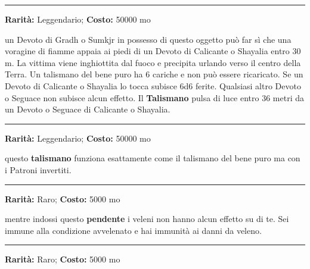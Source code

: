 \begin{multicols}{2}
\smallskip\noindent\rule{\linewidth}{2pt}  \hypertarget{TalismanodelBenepuro}{}\medskip{}\noindent\label{TalismanodelBenepuro}

\textbf{Rarità:} Leggendario; \textbf{Costo:} 50000 mo

un Devoto di Gradh o Sumkjr in possesso di questo oggetto può far sì che una voragine di fiamme appaia ai piedi di un Devoto di Calicante o Shayalia entro 30 m. La vittima viene inghiottita dal fuoco e precipita urlando verso il centro della Terra. Un talismano del bene puro ha 6 cariche e non può essere ricaricato. Se un Devoto di Calicante o Shayalia lo tocca subisce 6d6 ferite. Qualsiasi altro Devoto o Seguace non subisce alcun effetto. Il \textbf{Talismano} pulsa di luce entro 36 metri da un Devoto o Seguace di Calicante o Shayalia.

\smallskip\noindent\rule{\linewidth}{2pt}  \hypertarget{TalismanodelMaleestremo}{}\medskip{}\noindent\label{TalismanodelMaleestremo}

\textbf{Rarità:} Leggendario; \textbf{Costo:} 50000 mo

questo \textbf{talismano} funziona esattamente come il talismano del bene puro ma con i Patroni invertiti.

\smallskip\noindent\rule{\linewidth}{2pt}  \hypertarget{TalismanodellaProtezionedalVeleno}{}\medskip{}\noindent\label{TalismanodellaProtezionedalVeleno}

\textbf{Rarità:} Raro; \textbf{Costo:} 5000 mo

mentre indossi questo \textbf{pendente} i veleni non hanno alcun effetto su di te. Sei immune alla condizione avvelenato e hai immunità ai danni da veleno.

\smallskip\noindent\rule{\linewidth}{2pt}  \hypertarget{TalismanodellaSalute}{}\medskip{}\noindent\label{TalismanodellaSalute}

\textbf{Rarità:} Raro; \textbf{Costo:} 5000 mo


\end{multicols}
